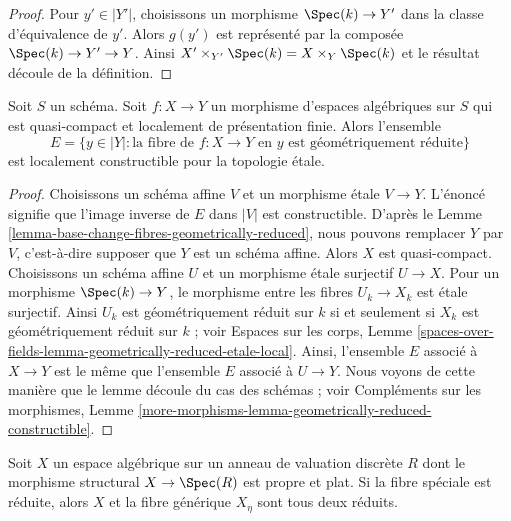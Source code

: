 \begin{proof}
Pour $y' \in |Y'|$, choisissons un morphisme $\Spec(k) \to Y'$
dans la classe d'équivalence de $y'$. Alors $g(y')$ est
représenté par la composée $\Spec(k) \to Y' \to Y$.
Ainsi $X' \times_{Y'} \Spec(k) = X \times_Y \Spec(k)$
et le résultat découle de la définition.
\end{proof}

\begin{lemma}
\label{lemma-geometrically-reduced-constructible}
Soit $S$ un schéma. Soit $f : X \to Y$ un morphisme d'espaces algébriques
sur $S$ qui est quasi-compact et
localement de présentation finie. Alors l'ensemble
$$
E = \{y \in |Y| : \text{la fibre de }f : X \to Y\text{ en }y
\text{ est géométriquement réduite}\}
$$
est localement constructible pour la topologie étale.
\end{lemma}

\begin{proof}
Choisissons un schéma affine $V$ et un morphisme étale $V  \to Y$.
L'énoncé signifie que l'image inverse de $E$
dans $|V|$ est constructible. D'après le
Lemme \ref{lemma-base-change-fibres-geometrically-reduced},
nous pouvons remplacer $Y$ par $V$, c'est-à-dire supposer que $Y$
est un schéma affine. Alors $X$ est quasi-compact. Choisissons un
schéma affine $U$ et un morphisme étale surjectif $U \to X$.
Pour un morphisme $\Spec(k) \to Y$, le morphisme entre les fibres
$U_k \to X_k$ est étale surjectif. Ainsi $U_k$ est géométriquement
réduit sur $k$ si et seulement si $X_k$ est géométriquement réduit
sur $k$ ; voir Espaces sur les corps, Lemme
\ref{spaces-over-fields-lemma-geometrically-reduced-etale-local}.
Ainsi, l'ensemble $E$ associé à $X \to Y$ est le même que l'ensemble $E$
associé à $U \to Y$.
Nous voyons de cette manière que le lemme découle du cas
des schémas ; voir Compléments sur les morphismes, Lemme
\ref{more-morphisms-lemma-geometrically-reduced-constructible}.
\end{proof}

\begin{lemma}
\label{lemma-proper-flat-over-dvr-reduced-fibre}
Soit $X$ un espace algébrique sur un anneau de valuation discrète $R$
dont le morphisme structural $X \to \Spec(R)$ est propre et plat.
Si la fibre spéciale est réduite, alors
$X$ et la fibre générique $X_\eta$ sont tous deux réduits.
\end{lemma}

